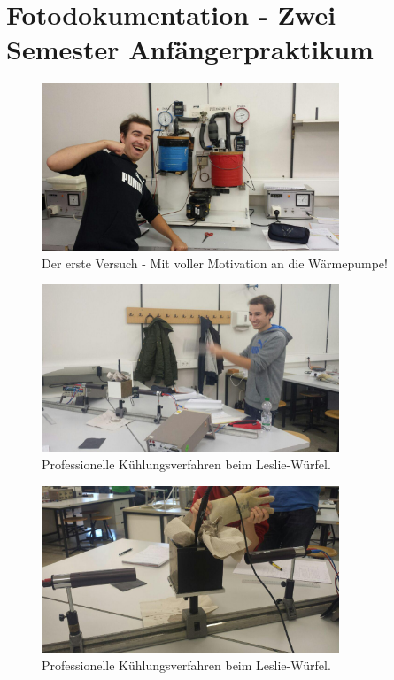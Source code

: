 \section{Fotodokumentation - Zwei Semester Anfängerpraktikum}
% 
% 
%

\begin{figure}
  \centering
  \includegraphics[height=5cm]{extra/photo_2016-07-05_00-27-30.jpg}
  \caption{Der erste Versuch - Mit voller Motivation an die Wärmepumpe!}
\end{figure}

\begin{figure}
  \centering
  \includegraphics[height=5cm]{extra/photo_2016-07-05_00-36-25.jpg}
  \caption{Professionelle Kühlungsverfahren beim Leslie-Würfel.}
\end{figure}

\begin{figure}
  \centering
  \includegraphics[height=5cm]{extra/photo_2016-07-05_00-38-18.jpg}
  \caption{Professionelle Kühlungsverfahren beim Leslie-Würfel.}
\end{figure}

